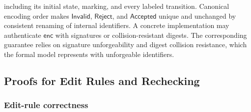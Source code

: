 including its initial state, marking, and every labeled transition.
Canonical encoding order makes \(\mathsf{Invalid}\), \(\mathsf{Reject}\), and \(\mathsf{Accepted}\) unique and unchanged by consistent renaming of internal identifiers.
A concrete implementation may authenticate \(\mathsf{enc}\) with signatures or collision-resistant digests.
The corresponding guarantee relies on signature unforgeability and digest collision resistance, which the formal model represents with unforgeable identifiers.

\subsection{Proofs for Edit Rules and Rechecking}

\subsubsection{Edit-rule correctness}
\label{app:schema-fidelity-proof}

